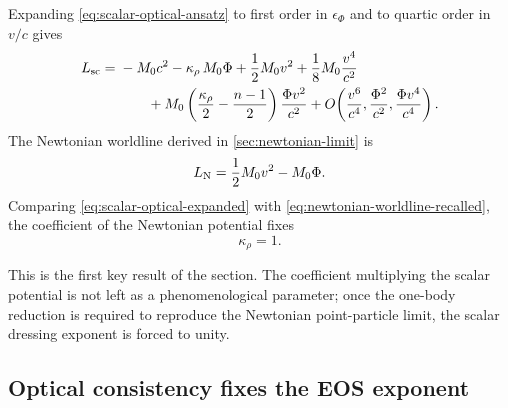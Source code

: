 \documentclass[11pt]{article}
\newcommand{\krho}{\kappa_{\rho}}
\newcommand{\PhiN}{\Phi}
\begin{document}
Expanding \eqref{eq:scalar-optical-ansatz} to first order in \(\epsilon_\Phi\) and to
quartic order in \(v/c\) gives
\begin{align}
L_{\rm sc}
=
{}&-M_0 c^2
- \krho\,M_0\PhiN
+ \frac12 M_0 v^2
+ \frac18 M_0\frac{v^4}{c^2}
\nonumber\\
&\hspace{2em}
+ M_0\left(\frac{\krho}{2}-\frac{n-1}{2}\right)\frac{\PhiN v^2}{c^2}
+ O\!\left(\frac{v^6}{c^4},\frac{\PhiN^2}{c^2},\frac{\PhiN v^4}{c^4}\right).
\label{eq:scalar-optical-expanded}
\end{align}
The Newtonian worldline derived in \cref{sec:newtonian-limit} is
\begin{equation}
L_{\rm N}
=
\frac12 M_0 v^2 - M_0\PhiN.
\label{eq:newtonian-worldline-recalled}
\end{equation}
Comparing \eqref{eq:scalar-optical-expanded} with
\eqref{eq:newtonian-worldline-recalled}, the coefficient of the Newtonian potential fixes
\begin{equation}
\krho=1.
\label{eq:kappa-rho-equals-one-self}
\end{equation}

This is the first key result of the section. The coefficient multiplying the scalar
potential is not left as a phenomenological parameter; once the one-body reduction is
required to reproduce the Newtonian point-particle limit, the scalar dressing exponent is
forced to unity.

\subsection{Optical consistency fixes the EOS exponent}
\label{sec:n-five}
\end{document}

